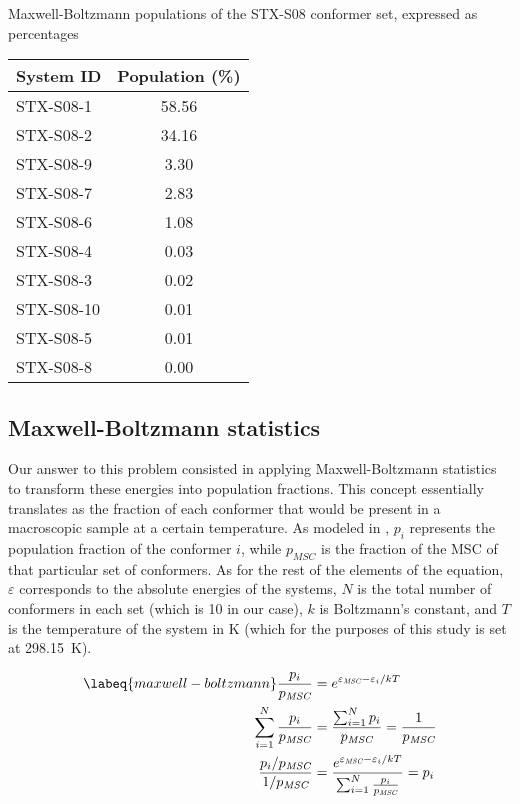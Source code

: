 \begin{margintable}
    \centering
    \caption[Maxwell-Boltzmann populations of STX-S08]{Maxwell-Boltzmann populations of the STX-S08 conformer set, expressed as percentages}
    \begin{tabular}{@{}l
                       S[table-format=2.2]@{}}
        \toprule
        System ID & {Population (\si{\percent})} \\
        \midrule
        STX-S08-1 & 58.56 \\
        STX-S08-2 & 34.16 \\
        STX-S08-9 & 3.30 \\
        STX-S08-7 & 2.83 \\
        STX-S08-6 & 1.08 \\
        STX-S08-4 & 0.03 \\
        STX-S08-3 & 0.02 \\
        STX-S08-10 & 0.01 \\
        STX-S08-5 & 0.01 \\
        STX-S08-8 & 0.00 \\
    \end{tabular}
\end{margintable}

\subsection{Maxwell-Boltzmann statistics}
Our answer to this problem consisted in applying Maxwell-Boltzmann statistics to transform these energies into population fractions.
This concept essentially translates as the fraction of each conformer that would be present in a macroscopic sample at a certain temperature.
As modeled in , $p_i$ represents the population fraction of the conformer $i$, while $p_\textit{MSC}$ is the fraction of the MSC of that particular set of conformers.
As for the rest of the elements of the equation, $\varepsilon$ corresponds to the absolute energies of the systems, $N$ is the total number of conformers in each set (which is 10 in our case), $k$ is Boltzmann's constant, and $T$ is the temperature of the system in \si{\kelvin} (which for the purposes of this study is set at \SI{298.15}{\kelvin}).

\begin{align}
\begin{split}
    \labeq{maxwell-boltzmann}
    \frac{p_i}{p_\textit{MSC}}&=e^{\varepsilon_\textit{MSC}-\varepsilon_i/kT} \\
    \sum_{i=1}^{N}\frac{p_i}{p_\textit{MSC}}&=\frac{\sum_{i=1}^{N}p_i}{p_\textit{MSC}}=\frac{1}{p_\textit{MSC}} \\
    \frac{p_i/p_\textit{MSC}}{1/p_\textit{MSC}}&=\frac{e^{\varepsilon_\textit{MSC}-\varepsilon_i/kT}}{\sum_{i=1}^{N}\frac{p_i}{p_\textit{MSC}}}=p_i \\
\end{split}
\end{align}

